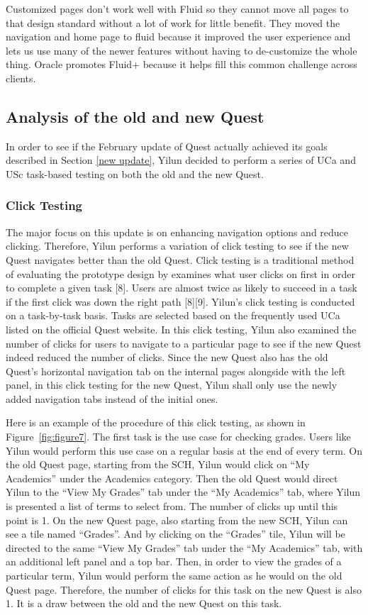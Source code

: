 \documentclass[conference]{IEEEtran}
\begin{document}
Customized pages don't work well with Fluid so they cannot move all pages to that design standard without a lot of work for little benefit. They moved the navigation and home page to fluid because it improved the user experience and lets us use many of the newer features without having to de-customize the whole thing. Oracle promotes Fluid+ because it helps fill this common challenge across clients.


\subsection{Analysis of the old and new Quest}
In order to see if the February update of Quest actually achieved its goals described in Section \ref{new update}, Yilun decided to perform a series of UCa and USc task-based testing on both the old and the new Quest.

\subsubsection{Click Testing}
The major focus on this update is on enhancing navigation options and reduce clicking. Therefore, Yilun performs a variation of click testing to see if the new Quest navigates better than the old Quest. Click testing is a traditional method of evaluating the prototype design by examines what user clicks on first in order to complete a given task [8]. Users are almost twice as likely to succeed in a task if the first click was down the right path [8][9]. Yilun's click testing is conducted on a task-by-task basis. Tasks are selected based on the frequently used UCa listed on the official Quest website. In this click testing, Yilun also examined the number of clicks for users to navigate to a particular page to see if the new Quest indeed reduced the number of clicks. Since the new Quest also has the old Quest's horizontal navigation tab on the internal pages alongside with the left panel, in this click testing for the new Quest, Yilun shall only use the newly added navigation tabs instead of the initial ones. 

Here is an example of the procedure of this click testing, as shown in Figure~\ref{fig:figure7}. The first task is the use case for checking grades. Users like Yilun would perform this use case on a regular basis at the end of every term. On the old Quest page, starting from the SCH, Yilun would click on ``My Academics'' under the Academics category. Then the old Quest would direct Yilun to the ``View My Grades'' tab under the ``My Academics'' tab, where Yilun is presented a list of terms to select from. The number of clicks up until this point is 1. On the new Quest page, also starting from the new SCH, Yilun can see a tile named ``Grades''. And by clicking on the ``Grades'' tile, Yilun will be directed to the same ``View My Grades'' tab under the ``My Academics'' tab, with an additional left panel and a top bar. Then, in order to view the grades of a particular term, Yilun would perform the same action as he would on the old Quest page. Therefore, the number of clicks for this task on the new Quest is also 1. It is a draw between the old and the new Quest on this task.
\end{document}
